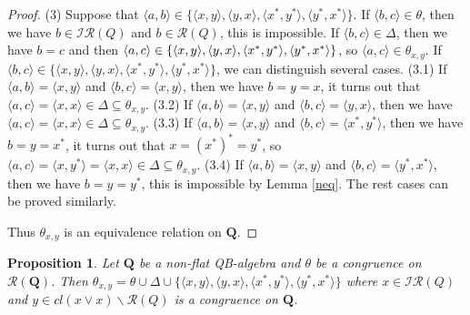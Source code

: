 \documentclass[12pt]{amsart}
\newtheorem{proposition}{Proposition}[section]
\theoremstyle{definition}
\theoremstyle{remark}
\numberwithin{equation}{section}
\begin{document}
\begin{proof}
(3) Suppose that $\langle a,b\rangle \in \{\langle x,y\rangle, \langle y,x\rangle, \langle x^{\ast},y^{\ast}\rangle, \langle y^{\ast},x^{\ast}\rangle \}$. If $\langle b,c\rangle\in \theta$, then we have $b\in \mathscr{IR}(Q)$ and $b\in \mathscr{R}(Q)$, this is impossible. If $\langle b,c\rangle \in \Delta$, then we have $b=c$ and then $\langle a,c\rangle \in \{\langle x,y\rangle, \langle y,x\rangle, \langle x^{\ast},\\ y^{\ast}\rangle, \langle y^{\ast},x^{\ast}\rangle \}$, so $\langle a,c\rangle \in \theta_{x,y}$. If $\langle b,c\rangle \in \{\langle x,y\rangle, \langle y,x\rangle, \langle x^{\ast},y^{\ast}\rangle, \langle y^{\ast},x^{\ast}\rangle \}$, we can distinguish several cases. (3.1) If $\langle a,b\rangle=\langle x,y\rangle$ and $\langle b,c\rangle=\langle x,y\rangle$, then we have $b=y=x$, it turns out that $\langle a,c\rangle=\langle x,x\rangle\in \Delta\subseteq \theta_{x,y}$. (3.2) If $\langle a,b\rangle=\langle x,y\rangle$ and $\langle b,c\rangle=\langle y,x\rangle$, then we have $\langle a,c\rangle=\langle x,x\rangle\in \Delta\subseteq \theta_{x,y}$. (3.3) If $\langle a,b\rangle=\langle x,y\rangle$ and $\langle b,c\rangle=\langle x^{\ast},y^{\ast}\rangle$, then we have $b=y=x^{\ast}$, it turns out that $x=(x^{\ast})^{\ast}=y^{\ast}$, so $\langle a,c\rangle=\langle x,y^{\ast}\rangle=\langle x,x\rangle\in \Delta\subseteq \theta_{x,y}$. (3.4) If $\langle a,b\rangle=\langle x,y\rangle$ and $\langle b,c\rangle=\langle y^{\ast},x^{\ast}\rangle$, then we have $b=y=y^{\ast}$, this is impossible by Lemma \ref{neq}. The rest cases can be proved similarly.

Thus $\theta_{x,y}$ is an equivalence relation on $\mathbf{Q}$.
\end{proof}


\begin{proposition}\label{xy con}
Let $\mathbf{Q}$ be a non-flat QB-algebra and $\theta$ be a congruence on $\mathscr{R}(\mathbf{Q})$. Then $\theta_{x,y}=\theta \cup \Delta \cup \{\langle x,y\rangle, \langle y,x\rangle, \langle x^{\ast},y^{\ast}\rangle, \langle y^{\ast},x^{\ast}\rangle \}$ where $x\in \mathscr{IR}(Q)$ and $y\in cl(x\vee x)\backslash\mathscr{R}(Q)$ is a congruence on $\mathbf{Q}$.
\end{proposition}
\end{document}
